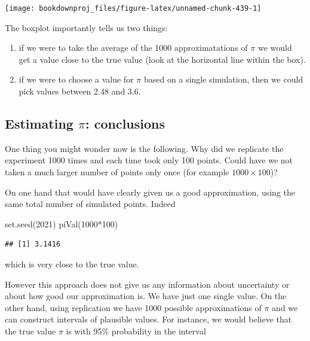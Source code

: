 \documentclass[
]{book}
\newenvironment{Shaded}{\begin{snugshade}}{\end{snugshade}}
\newcommand{\DecValTok}[1]{\textcolor[rgb]{0.00,0.00,0.81}{#1}}
\newcommand{\FunctionTok}[1]{\textcolor[rgb]{0.00,0.00,0.00}{#1}}
\newcommand{\NormalTok}[1]{#1}
\newcommand{\SpecialCharTok}[1]{\textcolor[rgb]{0.00,0.00,0.00}{#1}}
\begin{document}
\begin{center}\texttt{[image: bookdownproj\_files/figure-latex/unnamed-chunk-439-1]} \end{center}

The boxplot importantly tells us two things:

\begin{enumerate}
\def\labelenumi{\arabic{enumi}.}
\item
  if we were to take the average of the 1000 approximatations of \(\pi\) we would get a value close to the true value (look at the horizontal line within the box).
\item
  if we were to choose a value for \(\pi\) based on a single simulation, then we could pick values between 2.48 and 3.6.
\end{enumerate}

\hypertarget{estimating-pi-conclusions}{%
\subsection{\texorpdfstring{Estimating \(\pi\): conclusions}{Estimating \textbackslash pi: conclusions}}\label{estimating-pi-conclusions}}

One thing you might wonder now is the following. Why did we replicate the experiment 1000 times and each time took only 100 points. Could have we not taken a much larger number of points only once (for example \(1000\times 100\))?

On one hand that would have clearly given us a good approximation, using the same total number of simulated points. Indeed

\begin{Shaded}
\begin{Highlighting}[]
\FunctionTok{set.seed}\NormalTok{(}\DecValTok{2021}\NormalTok{)}
\FunctionTok{piVal}\NormalTok{(}\DecValTok{1000}\SpecialCharTok{*}\DecValTok{100}\NormalTok{)}
\end{Highlighting}
\end{Shaded}

\begin{verbatim}
## [1] 3.1416
\end{verbatim}

which is very close to the true value.

However this approach does not give us any information about uncertainty or about how good our approximation is. We have just one single value. On the other hand, using replication we have 1000 possible approximations of \(\pi\) and we can construct intervals of plausible values. For instance, we would believe that the true value \(\pi\) is with 95\% probability in the interval
\end{document}
